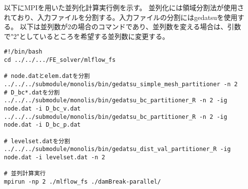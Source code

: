 以下にMPIを用いた並列化計算実行例を示す。
並列化には領域分割法が使用されており、入力ファイルを分割する。入力ファイルの分割にはgedatsuを使用する。
以下は並列数が2の場合のコマンドであり、並列数を変える場合は、引数で"2"としているところを希望する並列数に変更する。

\begin{lstlisting}[]
#!/bin/bash
cd ../../.../FE_solver/mlflow_fs

# node.datとelem.datを分割
../../../submodule/monolis/bin/gedatsu_simple_mesh_partitioner -n 2
# D_bc*.datを分割
../../../submodule/monolis/bin/gedatsu_bc_partitioner_R -n 2 -ig node.dat -i D_bc_v.dat
../../../submodule/monolis/bin/gedatsu_bc_partitioner_R -n 2 -ig node.dat -i D_bc_p.dat

# levelset.datを分割
../../../submodule/monolis/bin/gedatsu_dist_val_partitioner_R -ig node.dat -i levelset.dat -n 2

# 並列計算実行
mpirun -np 2 ./mlflow_fs ./damBreak-parallel/

\end{lstlisting}